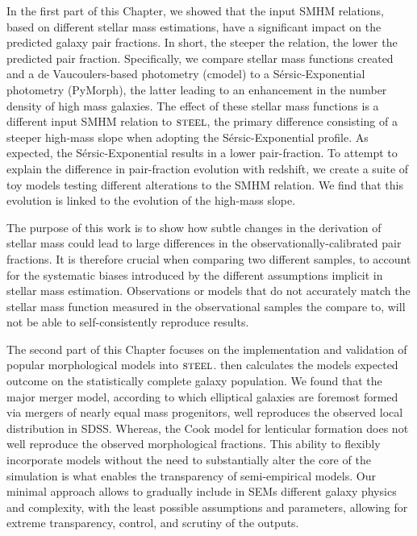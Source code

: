 In the first part of this Chapter, we showed that the input SMHM relations, based on different stellar mass estimations, have a significant impact on the predicted galaxy pair fractions. In short, the steeper the relation, the lower the predicted pair fraction. Specifically, we compare stellar mass functions created and a de Vaucoulers-based photometry (cmodel) to a S\'ersic-Exponential photometry (PyMorph), the latter leading to an enhancement in the number density of high mass galaxies. The effect of these stellar mass functions is a different input SMHM relation to $\textsc{steel}$, the primary difference consisting of a steeper high-mass slope when adopting the S\'ersic-Exponential profile. As expected, the S\'ersic-Exponential results in a lower pair-fraction. To attempt to explain the difference in pair-fraction evolution with redshift, we create a suite of toy models testing different alterations to the SMHM relation. We find that this evolution is linked to the evolution of the high-mass slope.

The purpose of this work is to show how subtle changes in the derivation of stellar mass could lead to large differences in the observationally-calibrated pair fractions. It is therefore crucial when comparing two different samples, to account for the systematic biases introduced by the different assumptions implicit in stellar mass estimation. Observations or models that do not accurately match the stellar mass function measured in the observational samples the compare to, will not be able to self-consistently reproduce results.

The second part of this Chapter focuses on the implementation and validation of popular morphological models into $\textsc{steel}$. \steel then calculates the models expected outcome on the statistically complete galaxy population. We found that the major merger model, according to which elliptical galaxies are foremost formed via mergers of nearly equal mass progenitors, well reproduces the observed local distribution in SDSS. Whereas, the Cook model for lenticular formation does not well reproduce the observed morphological fractions. This ability to flexibly incorporate models without the need to substantially alter the core of the simulation is what enables the transparency of semi-empirical models. Our minimal approach allows to gradually include in SEMs different galaxy physics and complexity, with the least possible assumptions and parameters, allowing for extreme transparency, control, and scrutiny of the outputs.

